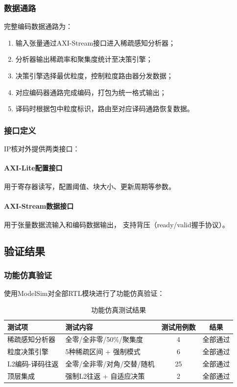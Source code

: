 \documentclass[a4paper,12pt,fontset=ubuntu]{ctexart}
\begin{document}
\subsubsection{数据通路}

完整编码数据通路为：

\begin{enumerate}
  \item 输入张量通过AXI-Stream接口进入稀疏感知分析器；
  \item 分析器输出稀疏率和聚集度统计至决策引擎；
  \item 决策引擎选择最优粒度，控制粒度路由器分发数据；
  \item 对应编码器通路完成编码，打包为统一格式输出；
  \item 译码时根据包中粒度标识，路由至对应译码通路恢复数据。
\end{enumerate}

\subsubsection{接口定义}

IP核对外提供两类接口：

\paragraph{AXI-Lite配置接口}用于寄存器读写，配置阈值、块大小、更新周期等参数。

\paragraph{AXI-Stream数据接口}用于张量数据流输入和编码数据输出，
支持背压（ready/valid握手协议）。

\subsection{验证结果}

\subsubsection{功能仿真验证}

使用ModelSim对全部RTL模块进行了功能仿真验证：

\begin{table}[htbp]
\centering
\caption{功能仿真测试结果}
\begin{tabular}{llcc}
\toprule
\textbf{测试项} & \textbf{测试内容} & \textbf{测试用例数} & \textbf{结果} \\
\midrule
稀疏感知分析器 & 全零/全非零/50\%/聚集度 & 4 & 全部通过 \\
粒度决策引擎 & 5种稀疏区间 + 强制模式 & 6 & 全部通过 \\
L2编码-译码往返 & 全零/全非零/对角/交替/随机 & 25 & 全部通过 \\
顶层集成 & 强制L2往返 + 自适应决策 & 2 & 全部通过 \\
\bottomrule
\end{tabular}
\end{table}
\end{document}
